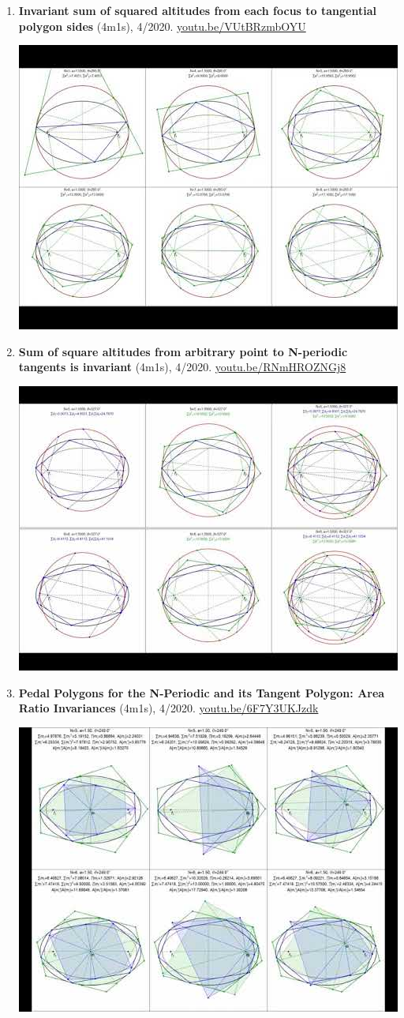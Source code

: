 \documentclass[12pt]{article}
\begin{document}
\begin{enumerate}[resume]
% 
\item \textbf{Invariant sum of squared altitudes from each focus to tangential polygon sides} (4m1s), 4/2020. \href{https://youtu.be/VUtBRzmbOYU}{\url{youtu.be/VUtBRzmbOYU}}
\begin{center}\includegraphics[width=.5\textwidth]{pics/VUtBRzmbOYU.jpg}\end{center}
% 
\item \textbf{Sum of square altitudes from arbitrary point to N-periodic tangents is invariant} (4m1s), 4/2020. \href{https://youtu.be/RNmHROZNGj8}{\url{youtu.be/RNmHROZNGj8}}
\begin{center}\includegraphics[width=.5\textwidth]{pics/RNmHROZNGj8.jpg}\end{center}
% 
\item \textbf{Pedal Polygons for the N-Periodic and its Tangent Polygon: Area Ratio Invariances} (4m1s), 4/2020. \href{https://youtu.be/6F7Y3UKJzdk}{\url{youtu.be/6F7Y3UKJzdk}}
\begin{center}\includegraphics[width=.5\textwidth]{pics/6F7Y3UKJzdk.jpg}\end{center}

\end{enumerate}
\end{document}
